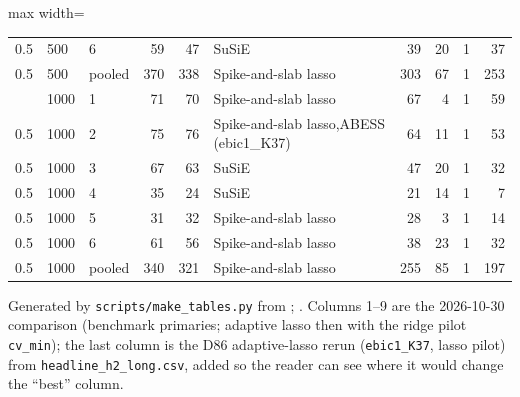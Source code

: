 \begin{center}
\begin{adjustbox}{max width=\linewidth}
\begin{tabular}{lllrrp{4.4cm}rrrr}
0.5 & 500 & 6 & 59 & 47 & SuSiE & 39 & 20 & 1 & 37 \\
0.5 & 500 & pooled & 370 & 338 & Spike-and-slab lasso & 303 & 67 & 1 & 253 \\
\addlinespace
0.5 & 1000 & 1 & 71 & 70 & Spike-and-slab lasso & 67 & 4 & 1 & 59 \\
0.5 & 1000 & 2 & 75 & 76 & Spike-and-slab lasso,ABESS (ebic1\_K37) & 64 & 11 & 1 & 53 \\
0.5 & 1000 & 3 & 67 & 63 & SuSiE & 47 & 20 & 1 & 32 \\
0.5 & 1000 & 4 & 35 & 24 & SuSiE & 21 & 14 & 1 & 7 \\
0.5 & 1000 & 5 & 31 & 32 & Spike-and-slab lasso & 28 & 3 & 1 & 14 \\
0.5 & 1000 & 6 & 61 & 56 & Spike-and-slab lasso & 38 & 23 & 1 & 32 \\
0.5 & 1000 & pooled & 340 & 321 & Spike-and-slab lasso & 255 & 85 & 1 & 197 \\
\bottomrule
\end{tabular}
\end{adjustbox}
\end{center}
\par{\footnotesize Generated by \texttt{scripts/make\_tables.py} from ; . Columns 1--9 are the 2026-10-30 comparison (benchmark primaries; adaptive lasso then with the ridge pilot \texttt{cv\_min}); the last column is the D86 adaptive-lasso rerun (\texttt{ebic1\_K37}, lasso pilot) from \texttt{headline\_h2\_long.csv}, added so the reader can see where it would change the ``best'' column.}\par
